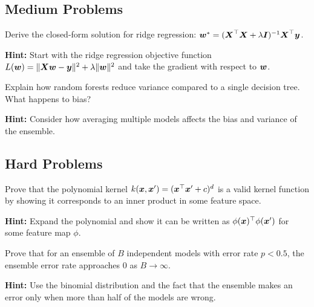 \subsection*{Medium Problems}

\begin{problem}
\label{prob:ridge-derivation}
Derive the closed-form solution for ridge regression: $\boldsymbol{w}^* = (\boldsymbol{X}^\top \boldsymbol{X} + \lambda \boldsymbol{I})^{-1} \boldsymbol{X}^\top \boldsymbol{y}$.

\textbf{Hint:} Start with the ridge regression objective function $L(\boldsymbol{w}) = \|\boldsymbol{X}\boldsymbol{w} - \boldsymbol{y}\|^2 + \lambda \|\boldsymbol{w}\|^2$ and take the gradient with respect to $\boldsymbol{w}$.
\end{problem}

\begin{problem}
\label{prob:random-forest-bias-variance}
Explain how random forests reduce variance compared to a single decision tree. What happens to bias?

\textbf{Hint:} Consider how averaging multiple models affects the bias and variance of the ensemble.
\end{problem}

\subsection*{Hard Problems}

\begin{problem}
\label{prob:svm-kernel-trick}
Prove that the polynomial kernel $k(\boldsymbol{x}, \boldsymbol{x}') = (\boldsymbol{x}^\top \boldsymbol{x}' + c)^d$ is a valid kernel function by showing it corresponds to an inner product in some feature space.

\textbf{Hint:} Expand the polynomial and show it can be written as $\phi(\boldsymbol{x})^\top \phi(\boldsymbol{x}')$ for some feature map $\phi$.
\end{problem}

\begin{problem}
\label{prob:ensemble-theory}
Prove that for an ensemble of $B$ independent models with error rate $p < 0.5$, the ensemble error rate approaches 0 as $B \to \infty$.

\textbf{Hint:} Use the binomial distribution and the fact that the ensemble makes an error only when more than half of the models are wrong.
\end{problem}
